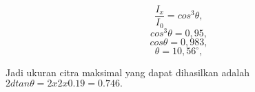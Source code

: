 \begin{displaymath}
\frac{I_{x}}{I_{0}} = cos^{3}\theta , 
\end{displaymath}
\begin{displaymath}
 cos^{3}\theta = 0,95 ,
\end{displaymath}
\begin{displaymath}
 cos\theta = 0,983 ,
\end{displaymath}
\begin{displaymath}
\theta = 10,56^{\circ} ,
\end{displaymath}

Jadi ukuran citra maksimal yang dapat dihasilkan adalah $2d tan\theta = 2 x 2 x 0.19 = 0.746.$